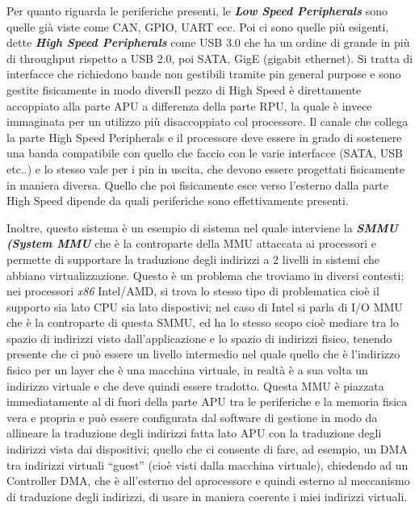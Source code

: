 \documentclass{article}
\begin{document}
Per quanto riguarda le periferiche presenti, le \textbf{\textit{Low Speed Peripherals}} sono quelle già viste come CAN, GPIO, UART ecc. Poi ci sono quelle più esigenti, dette \textbf{\textit{High Speed Peripherals}} come USB 3.0 che ha un ordine di grande in più di throughput rispetto a USB 2.0, poi SATA, GigE (gigabit ethernet). Si tratta di interfacce che richiedono bande non gestibili tramite pin general purpose e sono gestite fisicamente in modo diversIl pezzo di High Speed è direttamente accoppiato alla parte APU a differenza della parte RPU, la quale è invece immaginata per un utilizzo più disaccoppiato col processore. Il canale che collega la parte High Speed Peripherals e il processore deve essere in grado di sostenere una banda compatibile con quello che faccio con le varie interfacce (SATA, USB etc..) e lo stesso vale per i pin in uscita, che devono essere progettati fisicamente in maniera diversa. Quello che poi fisicamente esce verso l’esterno dalla parte High Speed dipende da quali periferiche sono effettivamente presenti. 

Inoltre, questo sistema è un esempio di sistema nel quale interviene la \textbf{\textit{SMMU (System MMU}} che è la controparte della MMU attaccata ai processori e permette di supportare la traduzione degli indirizzi a 2 livelli in sistemi che abbiano virtualizzazione. Questo è un problema che troviamo in diversi contesti; nei processori \textit{x86} Intel/AMD, si trova lo stesso tipo di problematica cioè il supporto sia lato CPU sia lato dispostivi; nel caso di Intel si parla di I/O MMU che è la controparte di questa SMMU, ed ha lo stesso scopo cioè mediare tra lo spazio di indirizzi visto dall’applicazione e lo spazio di indirizzi fisico, tenendo presente che ci può essere un livello intermedio nel quale quello che è l’indirizzo fisico per un layer che è una macchina virtuale, in realtà è a sua volta un indirizzo virtuale e che deve quindi essere tradotto. Questa MMU è piazzata immediatamente al di fuori della parte APU tra le periferiche e la memoria fisica vera e propria e può essere configurata dal software di gestione in modo da allineare la traduzione degli indirizzi fatta lato APU con la traduzione degli indirizzi vista dai dispositivi; quello che ci consente di fare, ad esempio, un DMA tra indirizzi virtuali “guest” (cioè visti dalla macchina virtuale), chiedendo ad un Controller DMA, che è all’esterno del aprocessore e quindi esterno al meccanismo di traduzione degli indirizzi, di usare in maniera coerente i miei indirizzi virtuali.
\end{document}
